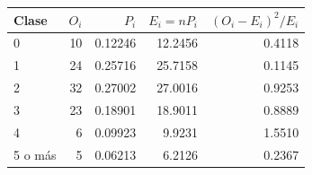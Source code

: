 \begin{tabular}{lrrrr}
\toprule
\textbf{Clase} & \textbf{$O_i$} & \textbf{$P_i$} & \textbf{$E_i=nP_i$} & \textbf{$(O_i-E_i)^2/E_i$} \\ \midrule
0 & 10 & 0.12246 & 12.2456 & 0.4118 \\
1 & 24 & 0.25716 & 25.7158 & 0.1145 \\
2 & 32 & 0.27002 & 27.0016 & 0.9253 \\
3 & 23 & 0.18901 & 18.9011 & 0.8889 \\
4 & 6 & 0.09923 & 9.9231 & 1.5510 \\
5 o más & 5 & 0.06213 & 6.2126 & 0.2367 \\
\bottomrule
\end{tabular}